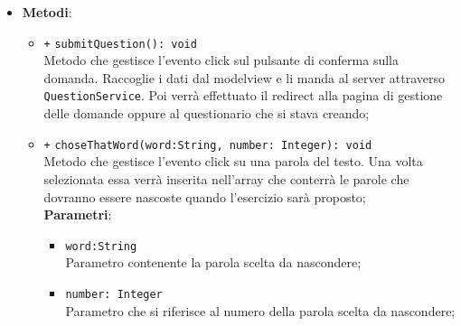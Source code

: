 \begin{itemize}
\begin{itemize}
	\end{itemize}
	\item \textbf{Metodi}:
	\begin{itemize}
			\item \texttt{+} \texttt{submitQuestion(): void}\\ 
			Metodo che gestisce l’evento click sul pulsante di conferma sulla domanda. Raccoglie i dati dal modelview e li manda al server attraverso \texttt{QuestionService}. Poi verrà effettuato il redirect alla pagina di gestione delle domande oppure al questionario che si stava creando; 
			\item \texttt{+} \texttt{choseThatWord(word:String, number: Integer): void}\\
			Metodo che gestisce l’evento click su una parola del testo. Una volta selezionata essa verrà inserita nell'array che conterrà le parole che dovranno essere nascoste quando l'esercizio sarà proposto; \\
			\textbf{Parametri}:
			\begin{itemize}
				\item \texttt{word:String} \\
				Parametro contenente la parola scelta da nascondere;
				\item \texttt{number: Integer} \\ 
				Parametro che si riferisce al numero della parola scelta da nascondere;
			\end{itemize}
	\end{itemize}
\end{itemize}

